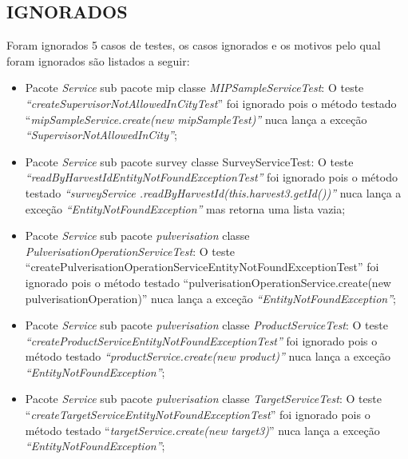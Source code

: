 \subsection{IGNORADOS}

Foram ignorados 5 casos de testes, os casos ignorados e os motivos pelo qual foram ignorados são listados a seguir:
  \begin{itemize}
    \item Pacote \textit{Service} sub pacote mip classe \textit{MIPSampleServiceTest}: O teste \textit{“createSupervisorNotAllowedInCityTest}” foi ignorado pois o método testado “\textit{mipSampleService.create(new mipSampleTest)”} nuca lança a exceção \textit{“SupervisorNotAllowedInCity”};
    
\item Pacote \textit{Service} sub pacote survey classe SurveyServiceTest: O teste \textit{“readByHarvestIdEntityNotFoundExceptionTest”} foi ignorado pois o método testado \textit{“surveyService
.readByHarvestId(this.harvest3.getId())”} nuca lança a exceção \textit{“EntityNotFoundException”} mas retorna uma lista vazia;

\item Pacote \textit{Service} sub pacote \textit{pulverisation} classe \textit{PulverisationOperationServiceTest}: O teste “createPulverisationOperationServiceEntityNotFoundExceptionTest” foi ignorado pois o método testado “pulverisationOperationService.create(new pulverisationOperation)” nuca lança a exceção \textit{“EntityNotFoundException”};

\item Pacote \textit{Service} sub pacote \textit{pulverisation} classe \textit{ProductServiceTest}: O teste\textit{ “createProductServiceEntityNotFoundExceptionTest”} foi ignorado pois o método testado\textit{ “productService.create(new product)”} nuca lança a exceção \textit{“EntityNotFoundException”};

\item Pacote \textit{Service} sub pacote \textit{pulverisation} classe \textit{TargetServiceTest}: O teste “\textit{createTargetServiceEntityNotFoundExceptionTest}” foi ignorado pois o método testado “\textit{targetService.create(new target3)}” nuca lança a exceção \textit{“EntityNotFoundException”};


    \end{itemize}
